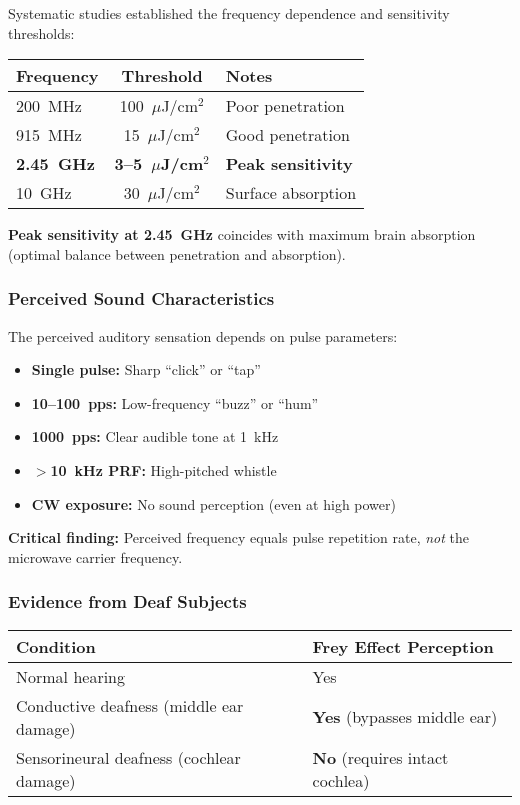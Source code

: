 Systematic studies established the frequency dependence and sensitivity thresholds:

\begin{center}
\begin{tabular}{@{}lcl@{}}
\toprule
\textbf{Frequency} & \textbf{Threshold} & \textbf{Notes} \\
\midrule
200~MHz & 100~$\mu$J/cm$^2$ & Poor penetration \\
915~MHz & 15~$\mu$J/cm$^2$ & Good penetration \\
\textbf{2.45~GHz} & \textbf{3--5~$\mu$J/cm$^2$} & \textbf{Peak sensitivity} \\
10~GHz & 30~$\mu$J/cm$^2$ & Surface absorption \\
\bottomrule
\end{tabular}
\end{center}

\textbf{Peak sensitivity at 2.45~GHz} coincides with maximum brain absorption (optimal balance between penetration and absorption).

\subsubsection{Perceived Sound Characteristics}

The perceived auditory sensation depends on pulse parameters:

\begin{itemize}
\item \textbf{Single pulse:} Sharp ``click'' or ``tap''
\item \textbf{10--100~pps:} Low-frequency ``buzz'' or ``hum''
\item \textbf{1000~pps:} Clear audible tone at 1~kHz
\item \textbf{$>$10~kHz PRF:} High-pitched whistle
\item \textbf{CW exposure:} No sound perception (even at high power)
\end{itemize}

\textbf{Critical finding:} Perceived frequency equals pulse repetition rate, \emph{not} the microwave carrier frequency.

\subsubsection{Evidence from Deaf Subjects}

\begin{center}
\begin{tabular}{@{}ll@{}}
\toprule
\textbf{Condition} & \textbf{Frey Effect Perception} \\
\midrule
Normal hearing & Yes \\
Conductive deafness (middle ear damage) & \textbf{Yes} (bypasses middle ear) \\
Sensorineural deafness (cochlear damage) & \textbf{No} (requires intact cochlea) \\
\bottomrule
\end{tabular}
\end{center}

